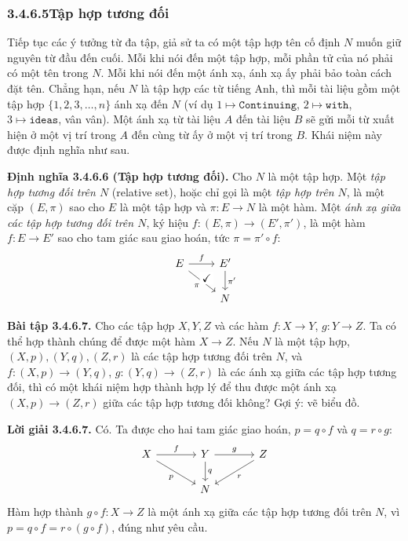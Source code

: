 \subsubsection*{3.4.6.5\quad Tập hợp tương đối}
Tiếp tục các ý tưởng từ đa tập, giả sử ta có một tập hợp tên cố định $N$ muốn giữ nguyên từ đầu đến cuối. Mỗi khi nói đến một tập hợp, mỗi phần tử của nó phải có một tên trong $N$. Mỗi khi nói đến một ánh xạ, ánh xạ ấy phải bảo toàn cách đặt tên. Chẳng hạn, nếu $N$ là tập hợp các từ tiếng Anh, thì mỗi tài liệu gồm một tập hợp $\{1,2,3,\ldots,n\}$ ánh xạ đến $N$ (ví dụ $1\mapsto\texttt{Continuing}$, $2\mapsto\texttt{with}$, $3\mapsto\texttt{ideas}$, vân vân). Một ánh xạ từ tài liệu $A$ đến tài liệu $B$ sẽ gửi mỗi từ xuất hiện ở một vị trí trong $A$ đến cùng từ ấy ở một vị trí trong $B$. Khái niệm này được định nghĩa như sau.

\noindent\textbf{Định nghĩa 3.4.6.6 (Tập hợp tương đối).} Cho $N$ là một tập hợp. Một \emph{tập hợp tương đối trên $N$} (relative set), hoặc chỉ gọi là một \emph{tập hợp trên $N$}, là một cặp $(E,\pi)$ sao cho $E$ là một tập hợp và $\pi:E\to N$ là một hàm. Một \emph{ánh xạ giữa các tập hợp tương đối trên $N$}, ký hiệu $f:(E,\pi)\to(E',\pi')$, là một hàm $f:E\to E'$ sao cho tam giác sau giao hoán, tức $\pi=\pi'\circ f$:
\[\begin{tikzcd}E\arrow[r,"f"]\arrow[dr,"\pi"']\arrow[dr,phantom,"\checkmark" description,pos=.35,xshift=8pt]&E'\arrow[d,"\pi'"]\\&N\end{tikzcd}\]

\noindent\textbf{Bài tập 3.4.6.7.} Cho các tập hợp $X,Y,Z$ và các hàm $f:X\to Y$, $g:Y\to Z$. Ta có thể hợp thành chúng để được một hàm $X\to Z$. Nếu $N$ là một tập hợp, $(X,p),(Y,q),(Z,r)$ là các tập hợp tương đối trên $N$, và $f:(X,p)\to(Y,q)$, $g:(Y,q)\to(Z,r)$ là các ánh xạ giữa các tập hợp tương đối, thì có một khái niệm hợp thành hợp lý để thu được một ánh xạ $(X,p)\to(Z,r)$ giữa các tập hợp tương đối không? Gợi ý: vẽ biểu đồ.

\noindent\textbf{Lời giải 3.4.6.7.} Có. Ta được cho hai tam giác giao hoán, $p=q\circ f$ và $q=r\circ g$:
\[\begin{tikzcd}[column sep=large]X\arrow[r,"f"]\arrow[dr,"p"']&Y\arrow[r,"g"]\arrow[d,"q"]&Z\arrow[dl,"r"]\\&N&\end{tikzcd}\]
Hàm hợp thành $g\circ f:X\to Z$ là một ánh xạ giữa các tập hợp tương đối trên $N$, vì $p=q\circ f=r\circ(g\circ f)$, đúng như yêu cầu.

